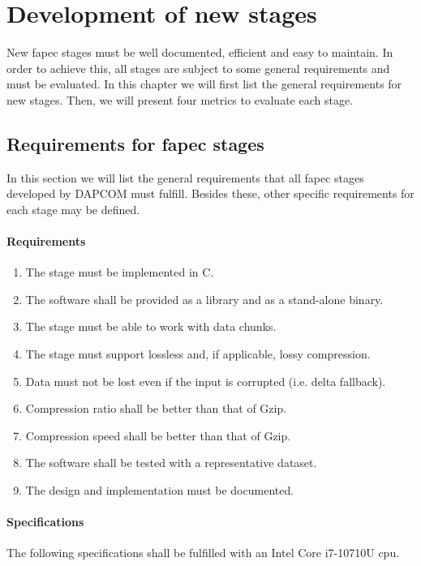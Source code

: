 \chapter{Development of new stages} \label{ch:new_stages}
New \acrshort{fapec} stages must be well documented, efficient and easy to maintain. In order to achieve this, all stages are subject to some general requirements and must be evaluated. In this chapter we will first list the general requirements for new stages. Then, we will present four metrics to evaluate each stage.

\section{Requirements for \acrshort{fapec} stages} \label{sec:fapec_reqs}
In this section we will list the general requirements that all \acrshort{fapec} stages developed by DAPCOM must fulfill. Besides these, other specific requirements for each stage may be defined.

\subsubsection{Requirements} \label{sec:requirements}
\begin{enumerate}
	\item The stage must be implemented in C. \label{req:c}
	\item The software shall be provided as a library and as a stand-alone binary. \label{req:lib_bin}
	\item The stage must be able to work with data chunks. \label{req:chunks}
	\item The stage must support lossless and, if applicable, lossy compression.
	\item Data must not be lost even if the input is corrupted (i.e. delta fallback).
	\item Compression ratio shall be better than that of Gzip.
	\item Compression speed shall be better than that of Gzip.
	\item The software shall be tested with a representative dataset.
	\item The design and implementation must be documented.
\end{enumerate}

\subsubsection{Specifications}
The following specifications shall be fulfilled with an Intel Core i7-10710U \acrshort{cpu}.

